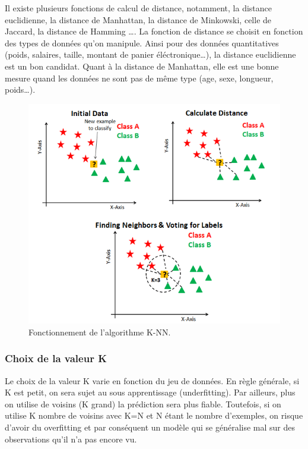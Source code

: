 Il existe plusieurs fonctions de calcul de distance, notamment, la distance 
euclidienne, la distance de Manhattan, la distance de Minkowski, celle de 
Jaccard, la distance de Hamming \ldots. La fonction de distance se choisit en
fonction des types de données qu’on manipule. Ainsi pour des données 
quantitatives (poids, salaires, taille, montant de panier éléctronique\ldots),
la distance euclidienne est un bon candidat. Quant à la distance de Manhattan,
elle est une bonne mesure quand les données ne sont pas de 
même type (age, sexe, longueur, poids\ldots).

\begin{figure}[h!]
  \begin{center}
    \includegraphics[width=12cm]{images/knn.png}
    \caption{Fonctionnement de l'algorithme K-NN.\label{fig:knnfonctionnement}}
  \end{center}
\end{figure}

\subsubsection{Choix de la valeur K}

Le choix de la valeur K varie en fonction du jeu de données. En règle générale, 
si K est petit, on sera sujet au sous apprentissage (underfitting). Par 
ailleurs, plus on utilise de voisins (K grand) la prédiction sera plus fiable. 
Toutefois, si on utilise K nombre de voisins avec K=N et N étant le nombre 
d’exemples, on risque d’avoir du overfitting et par conséquent un modèle qui se
généralise mal sur des observations qu’il n’a pas encore vu.

